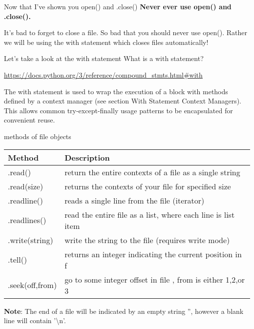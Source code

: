 \documentclass[10pt]{beamer}
\begin{document}
\begin{frame}{Now that I've shown you open() and .close()}
\textbf{Never ever use open() and .close().}

It's bad to forget to close a file. So bad that you should never use open(). Rather we will be using the with statement which closes files automatically! 
\end{frame}

\begin{frame}{Let's take a look at the with statement}
What is a with statement? 

\url{https://docs.python.org/3/reference/compound\_stmts.html\#with}

The with statement is used to wrap the execution of a block with methods defined by a context manager (see section With Statement Context Managers). This allows common try-except-finally usage patterns to be encapsulated for convenient reuse.
\end{frame}


\begin{frame}{methods of file objects}
\begin{table}
\begin{tabular}{ll}
\textbf{Method} & \textbf{Description}  \\
\hline
.read() & return the entire contexts of a file as a single string \\
.read(size) & returns the contexts of your file for specified size \\
.readline() & reads a single line from the file (iterator) \\
.readlines() & read the entire file as a list, where each line is list item \\
.write(string) & write the string to the file (requires write mode) \\
.tell() & returns an integer indicating the current position in f \\
.seek(off,from) & go to some integer offset in file , from is either 1,2,or 3 \\
\end{tabular}
\end{table}
\textbf{Note}: The end of a file will be indicated by an empty string '', however a blank line will contain '\textbackslash n'.
\end{frame}
\end{document}
